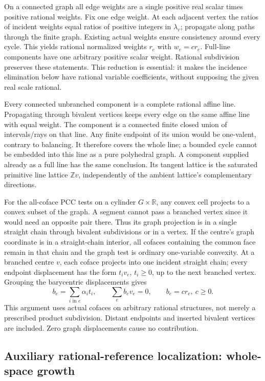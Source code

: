 \documentclass[
  11pt,
]{article}
\begin{document}
On a connected graph all edge weights are a single positive real scalar
times positive rational weights. Fix one edge weight. At each adjacent
vertex the ratios of incident weights equal ratios of positive integers
in \(\lambda_v\); propagate along paths through the finite graph.
Existing actual weights ensure consistency around every cycle. This
yields rational normalized weights \(r_e\) with \(w_e=c r_e\). Full-line
components have one arbitrary positive scalar weight. Rational
subdivision preserves these statements. This reduction is essential: it
makes the incidence elimination below have rational variable
coefficients, without supposing the given real scale rational.

Every connected unbranched component is a complete rational affine line.
Propagating through bivalent vertices keeps every edge on the same
affine line with equal weight. The component is a connected finite
closed union of intervals/rays on that line. Any finite endpoint of its
union would be one-valent, contrary to balancing. It therefore covers
the whole line; a bounded cycle cannot be embedded into this line as a
pure polyhedral graph. A component supplied already as a full line has
the same conclusion. Its tangent lattice is the saturated primitive line
lattice \(\mathbb{Z}v\), independently of the ambient lattice's
complementary directions.

For the all-coface PCC tests on a cylinder \(G\times\mathbb{R}\), any
convex cell projects to a convex subset of the graph. A segment cannot
pass a branched vertex since it would need an opposite pair there. Thus
its graph projection is in a single straight chain through bivalent
subdivisions or in a vertex. If the centre's graph coordinate is in a
straight-chain interior, all cofaces containing the common face remain
in that chain and the graph test is ordinary one-variable convexity. At
a branched centre \(v\), each coface projects into one incident straight
chain; every endpoint displacement has the form \(t_i v_e\),
\(t_i\geq0\), up to the next branched vertex. Grouping the barycentric
displacements gives \[
 b_e=\sum_{i\text{ in }e}\alpha_i t_i,
 \qquad\sum_e b_ev_e=0,\qquad b_e=c r_e,\ c\geq0.           \tag{9}
\] This argument uses actual cofaces on arbitrary rational structures,
not merely a prescribed product subdivision. Distant endpoints and
inserted bivalent vertices are included. Zero graph displacements cause
no contribution.

\subsection{Auxiliary rational-reference localization: whole-space
growth}\label{auxiliary-rational-reference-localization-whole-space-growth}
\end{document}
